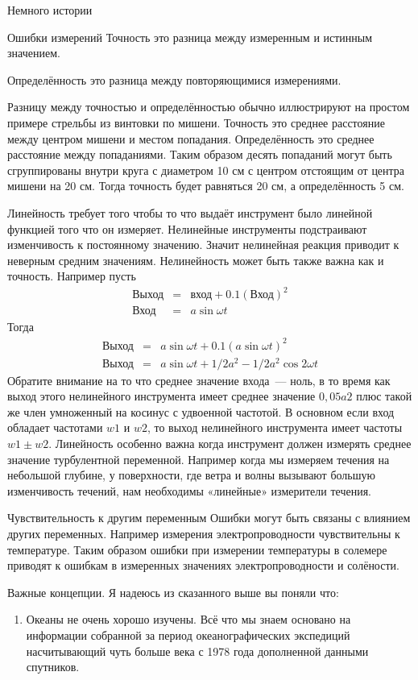 \begin{chapter}{Немного истории}
\begin{section}{Ошибки измерений}
Точность это разница между измеренным и истинным значением.

Определённость это разница между повторяющимися измерениями.

Разницу между точностью и определённостью обычно иллюстрируют на
простом примере стрельбы из винтовки по мишени. Точность это среднее
расстояние между центром мишени и местом попадания. Определённость это
среднее расстояние между попаданиями. Таким образом десять попаданий
могут быть сгруппированы внутри круга с диаметром 10 см с центром
отстоящим от центра мишени на 20 см. Тогда точность будет равняться 20
см, а определённость 5 см.

Линейность требует того чтобы то что выдаёт инструмент было линейной
функцией того что он измеряет. Нелинейные инструменты подстраивают
изменчивость к постоянному значению. Значит нелинейная реакция
приводит к неверным средним значениям. Нелинейность может быть также
важна как и точность. Например пусть
\begin{eqnarray}
\mbox{Выход} & = & \mbox{вход} +0.1 (\mbox{Вход})^2 \\
\mbox{Вход}  & = & a \sin \omega t
\end{eqnarray}
Тогда
\begin{eqnarray}
\mbox{Выход} & = & a \sin \omega t + 0.1 (a \sin \omega t)^2 \\
\mbox{Выход} & = & a \sin \omega t + 1/2 a^2 - 1/2 a^2 \cos 2\omega t
\end{eqnarray}
Обратите внимание на то что среднее значение входа~--- ноль, в то
время как выход этого нелинейного инструмента имеет среднее значение
$0,05a2$ плюс такой же член умноженный на косинус с удвоенной
частотой. В основном если вход обладает частотами $w1$ и $w2$, то выход
нелинейного инструмента имеет частоты $w1\pm w2$. Линейность особенно важна
когда инструмент должен измерять среднее значение турбулентной
переменной. Например когда мы измеряем течения на небольшой глубине, у
поверхности, где ветра и волны вызывают большую изменчивость течений,
нам необходимы «линейные» измерители течения.

Чувствительность к другим переменным Ошибки могут быть связаны с
влиянием других переменных. Например измерения электропроводности
чувствительны к температуре. Таким образом ошибки при измерении
температуры в солемере приводят к ошибкам в измеренных значениях
электропроводности и солёности.
\end{section}

\begin{section}{Важные концепции.}
Я надеюсь из сказанного выше вы поняли что:
\begin{enumerate}
\item
Океаны не очень хорошо изучены. Всё что мы знаем основано на
информации собранной за период океанографических экспедиций
насчитывающий чуть больше века с 1978 года дополненной данными
спутников.


\end{enumerate}
\end{section}
\end{chapter}

